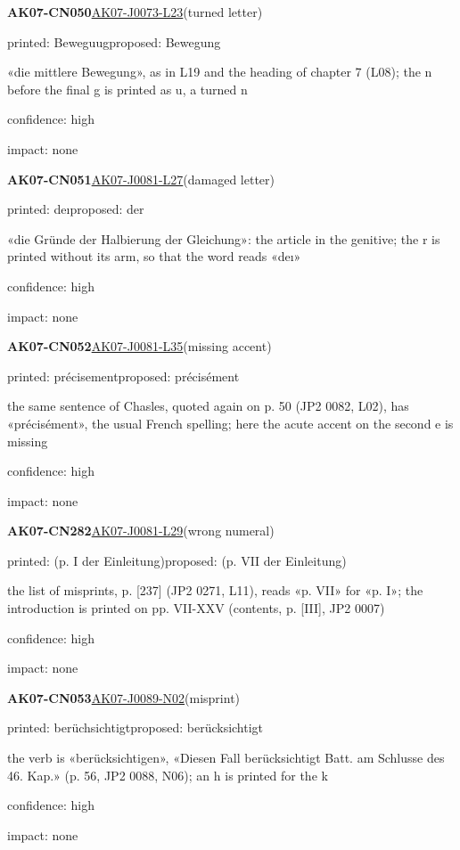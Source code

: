 \documentclass[11pt]{article}
\begin{document}
\noindent\textbf{AK07-CN050}\enspace\hyperlink{AK07-J0073-L23}{AK07-J0073-L23}\enspace(turned letter)\par\noindent printed: Beweguug\enspace proposed: Bewegung\par\noindent «die mittlere Bewegung», as in L19 and the heading of chapter 7 (L08); the n before the final g is printed as u, a turned n\par\noindent confidence: high\par\noindent impact: none\par\medskip
\noindent\textbf{AK07-CN051}\enspace\hyperlink{AK07-J0081-L27}{AK07-J0081-L27}\enspace(damaged letter)\par\noindent printed: deı\enspace proposed: der\par\noindent «die Gründe der Halbierung der Gleichung»: the article in the genitive; the r is printed without its arm, so that the word reads «deı»\par\noindent confidence: high\par\noindent impact: none\par\medskip
\noindent\textbf{AK07-CN052}\enspace\hyperlink{AK07-J0081-L35}{AK07-J0081-L35}\enspace(missing accent)\par\noindent printed: précisement\enspace proposed: précisément\par\noindent the same sentence of Chasles, quoted again on p. 50 (JP2 0082, L02), has «précisément», the usual French spelling; here the acute accent on the second e is missing\par\noindent confidence: high\par\noindent impact: none\par\medskip
\noindent\textbf{AK07-CN282}\enspace\hyperlink{AK07-J0081-L29}{AK07-J0081-L29}\enspace(wrong numeral)\par\noindent printed: (p. I der Einleitung)\enspace proposed: (p. VII der Einleitung)\par\noindent the list of misprints, p. [237] (JP2 0271, L11), reads «p. VII» for «p. I»; the introduction is printed on pp. VII-XXV (contents, p. [III], JP2 0007)\par\noindent confidence: high\par\noindent impact: none\par\medskip
\noindent\textbf{AK07-CN053}\enspace\hyperlink{AK07-J0089-N02}{AK07-J0089-N02}\enspace(misprint)\par\noindent printed: berüchsichtigt\enspace proposed: berücksichtigt\par\noindent the verb is «berücksichtigen», «Diesen Fall berücksichtigt Batt. am Schlusse des 46. Kap.» (p. 56, JP2 0088, N06); an h is printed for the k\par\noindent confidence: high\par\noindent impact: none\par\medskip
\end{document}
